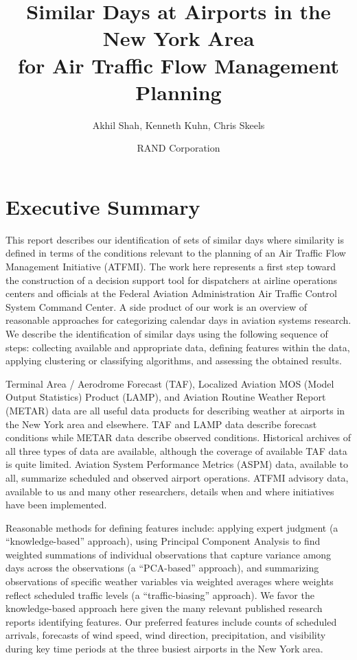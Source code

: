 \documentclass[11pt]{scrartcl}
\title{Similar Days at Airports in the New York Area\\ for Air Traffic Flow Management Planning}
\author{Akhil Shah, Kenneth Kuhn, Chris Skeels}
\date{RAND Corporation}
\begin{document}
\maketitle


\section*{Executive Summary}
This report describes our identification of sets of similar days where similarity is defined in terms of the conditions relevant to the planning of an Air Traffic Flow Management Initiative (ATFMI).  The work here represents a first step toward the construction of a decision support tool for dispatchers at airline operations centers and officials at the Federal Aviation Administration Air Traffic Control System Command Center.  A side product of our work is an overview of reasonable approaches for categorizing calendar days in aviation systems research.  We describe the identification of similar days using the following sequence of steps: collecting available and appropriate data, defining features within the data, applying clustering or classifying algorithms, and assessing the obtained results.

Terminal Area / Aerodrome Forecast (TAF), Localized Aviation MOS (Model Output Statistics) Product (LAMP), and Aviation Routine Weather Report (METAR) data are all useful data products for describing weather at airports in the New York area and elsewhere.  TAF and LAMP data describe forecast conditions while METAR data describe observed conditions.  Historical archives of all three types of data are available, although the coverage of available TAF data is quite limited.  Aviation System Performance Metrics (ASPM) data, available to all, summarize scheduled and observed airport operations.  ATFMI advisory data, available to us and many other researchers, details when and where initiatives have been implemented.

Reasonable methods for defining features include: applying expert judgment (a ``knowledge-based'' approach), using Principal Component Analysis to find weighted summations of individual observations that capture variance among days across the observations (a ``PCA-based'' approach), and summarizing observations of specific weather variables via weighted averages where weights reflect scheduled traffic levels (a ``traffic-biasing'' approach).  We favor the knowledge-based approach here given the many relevant published research reports identifying features.  Our preferred features include counts of scheduled arrivals, forecasts of wind speed, wind direction, precipitation, and visibility during key time periods at the three busiest airports in the New York area.
\end{document}
